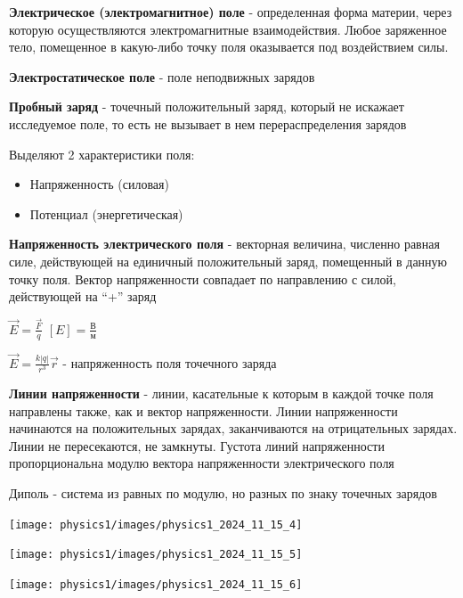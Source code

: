\documentclass[12pt]{article}
\begin{document}
    \textbf{Электрическое (электромагнитное) поле} - определенная форма материи,
    через которую осуществляются электромагнитные взаимодействия. Любое заряженное тело, помещенное в какую-либо точку поля
    оказывается под воздействием силы.

    \textbf{Электростатическое поле} - поле неподвижных зарядов

    \textbf{Пробный заряд} - точечный положительный заряд, который не искажает исследуемое поле, то есть не вызывает в нем перераспределения зарядов

    Выделяют 2 характеристики поля:

    \begin{itemize}
        \item Напряженность (силовая)

        \item Потенциал (энергетическая)
    \end{itemize}

    \textbf{Напряженность электрического поля} - векторная величина, численно равная силе, действующей на единичный положительный заряд, помещенный в данную точку поля.
    Вектор напряженности совпадает по направлению с силой, действующей на \enquote{+} заряд

    $\vec{E} = \frac{\vec{F}}{q}$ \hfill $[E] = \frac{\text{В}}{\text{м}}$

    $\vec{E} = \frac{k|q|}{r^3}\vec{r}$ - напряженность поля точечного заряда

    \textbf{Линии напряженности} - линии, касательные к которым в каждой точке поля направлены также, как и вектор напряженности. 
    Линии напряженности начинаются на положительных зарядах, заканчиваются на отрицательных зарядах. Линии не пересекаются, не замкнуты. 
    Густота линий напряженности пропорциональна модулю вектора напряженности электрического поля

    Диполь - система из равных по модулю, но разных по знаку точечных зарядов

    \begin{multicols}{3}
        \begin{center}
            \texttt{[image: physics1/images/physics1\_2024\_11\_15\_4]}
        \end{center}

        \begin{center}
            \texttt{[image: physics1/images/physics1\_2024\_11\_15\_5]}
        \end{center}

        \begin{center}
            \texttt{[image: physics1/images/physics1\_2024\_11\_15\_6]}
        \end{center}
    \end{multicols}
\end{document}
